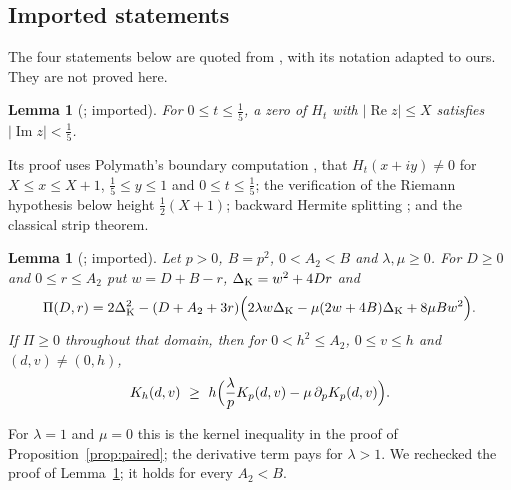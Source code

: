 \documentclass[11pt]{article}
\newtheorem{lemma}[theorem]{Lemma}
\theoremstyle{definition}
\theoremstyle{remark}
\newcommand{\re}{\operatorname{Re}}
\newcommand{\im}{\operatorname{Im}}
\numberwithin{equation}{section}
\begin{document}
\subsection{Imported statements}\label{sec:imported}

The four statements below are quoted from \cite{hb}, with its notation
adapted to ours. They are not proved here.

\begin{lemma}[{\cite[Lemma~2]{hb}}; imported]\label{lem:hb2}
For $0\le t\le\frac15$, a zero of $H_t$ with $\lvert\re z\rvert\le X$
satisfies $\lvert\im z\rvert<\frac15$.
\end{lemma}

Its proof uses Polymath's boundary computation
\cite[Section~8.4, claim~(a)]{polymath}, that $H_t(x+iy)\ne0$ for
$X\le x\le X+1$, $\frac15\le y\le1$ and $0\le t\le\frac15$; the verification
of the Riemann hypothesis below height $\frac12(X+1)$; backward Hermite
splitting \cite[Proposition~3.1(ii)]{polymath}; and the classical strip
theorem.

\begin{lemma}[{\cite[Lemma~10]{hb}}; imported]\label{lem:hb10}
Let $p>0$, $B=p^2$, $0<A_2<B$ and $\lambda,\mu\ge0$. For $D\ge0$ and
$0\le r\le A_2$ put $w=D+B-r$, $\Delta_{\rm K}=w^2+4Dr$ and
\begin{equation}\label{eq:Pi}
\Pi(D,r)=2\Delta_{\rm K}^2-(D+A_2+3r)\Bigl(2\lambda w\Delta_{\rm K}-\mu(2w+4B)\Delta_{\rm K}+8\mu Bw^2\Bigr).
\end{equation}
If $\Pi\ge0$ throughout that domain, then for $0<h^2\le A_2$, $0\le v\le h$
and $(d,v)\ne(0,h)$,
\[
K_h(d,v)\ \ge\ h\Bigl(\frac\lambda pK_p(d,v)-\mu\,\partial_pK_p(d,v)\Bigr).
\]
\end{lemma}

For $\lambda=1$ and $\mu=0$ this is the kernel inequality in the proof of
Proposition~\ref{prop:paired}; the derivative term pays for $\lambda>1$.
We rechecked the proof of Lemma~\ref{lem:hb10}; it holds for every
$A_2<B$.
\end{document}
